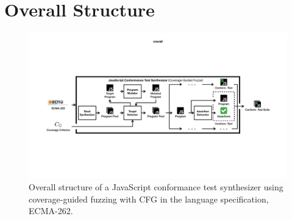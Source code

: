 \section{Overall Structure}\label{sec:overall}

\begin{figure}
  \includegraphics[width=\textwidth]{img/overall}
  \caption{
    Overall structure of a JavaScript conformance test synthesizer using
    coverage-guided fuzzing with CFG in the language specification, ECMA-262.
  }
  \label{fig:overall}
\end{figure}


